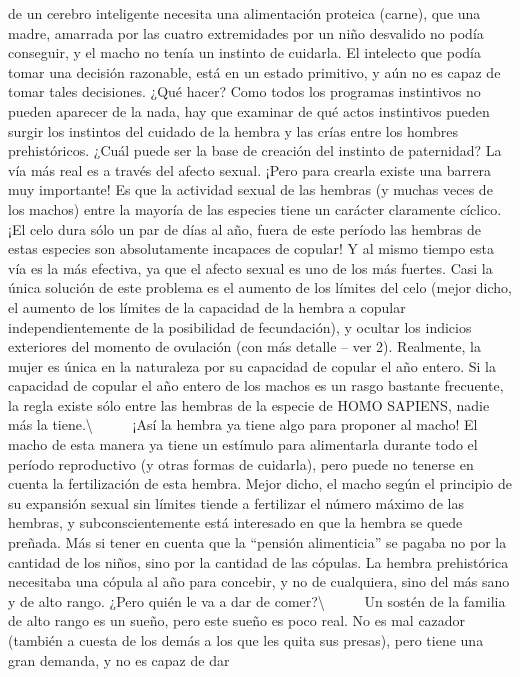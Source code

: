 de un cerebro inteligente necesita una alimentación proteica (carne),
que una madre, amarrada por las cuatro extremidades por un niño
desvalido no podía conseguir, y el macho no tenía un instinto de
cuidarla. El intelecto que podía tomar una decisión razonable, está en
un estado primitivo, y aún no es capaz de tomar tales decisiones. ¿Qué
hacer? Como todos los programas instintivos no pueden aparecer de la
nada, hay que examinar de qué actos instintivos pueden surgir los
instintos del cuidado de la hembra y las crías entre los hombres
prehistóricos. ¿Cuál puede ser la base de creación del instinto de
paternidad? La vía más real es a través del afecto sexual. ¡Pero para
crearla existe una barrera muy importante! Es que la actividad sexual de
las hembras (y muchas veces de los machos) entre la mayoría de las
especies tiene un carácter claramente cíclico. ¡El celo dura sólo un par
de días al año, fuera de este período las hembras de estas especies son
absolutamente incapaces de copular! Y al mismo tiempo esta vía es la más
efectiva, ya que el afecto sexual es uno de los más fuertes. Casi la
única solución de este problema es el aumento de los límites del celo
(mejor dicho, el aumento de los límites de la capacidad de la hembra a
copular independientemente de la posibilidad de fecundación), y ocultar
los indicios exteriores del momento de ovulación (con más detalle -- ver
2). Realmente, la mujer es única en la naturaleza por su capacidad de
copular el año entero. Si la capacidad de copular el año entero de los
machos es un rasgo bastante frecuente, la regla existe sólo entre las
hembras de la especie de HOMO SAPIENS, nadie más la
tiene.\textbackslash{} ~ ~ ~ ¡Así la hembra ya tiene algo para proponer
al macho! El macho de esta manera ya tiene un estímulo para alimentarla
durante todo el período reproductivo (y otras formas de cuidarla), pero
puede no tenerse en cuenta la fertilización de esta hembra. Mejor dicho,
el macho según el principio de su expansión sexual sin límites tiende a
fertilizar el número máximo de las hembras, y subconscientemente está
interesado en que la hembra se quede preñada. Más si tener en cuenta que
la ``pensión alimenticia'' se pagaba no por la cantidad de los niños,
sino por la cantidad de las cópulas. La hembra prehistórica necesitaba
una cópula al año para concebir, y no de cualquiera, sino del más sano y
de alto rango. ¿Pero quién le va a dar de comer?\textbackslash{} ~ ~ ~
Un sostén de la familia de alto rango es un sueño, pero este sueño es
poco real. No es mal cazador (también a cuesta de los demás a los que
les quita sus presas), pero tiene una gran demanda, y no es capaz de dar
